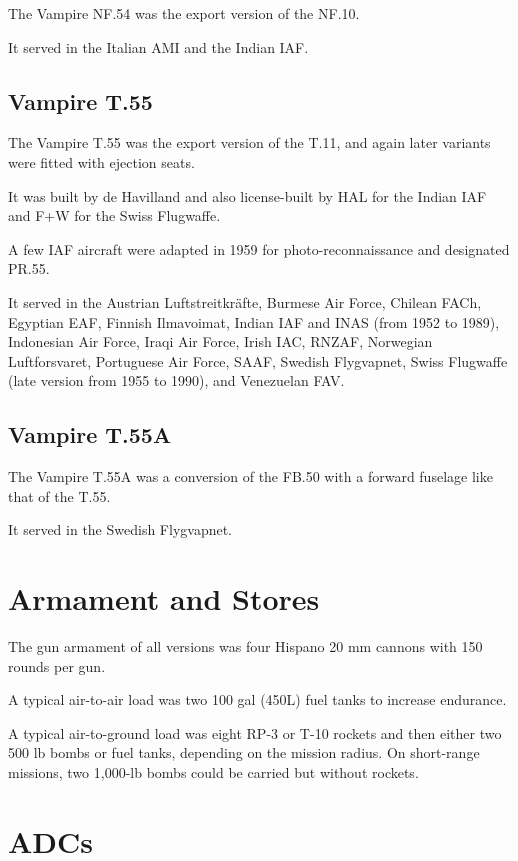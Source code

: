 The Vampire NF.54 was the export version of the NF.10.

It served in the Italian AMI and the Indian IAF.

\subsection{Vampire T.55}

The Vampire T.55 was the export version of the T.11, and again later variants were fitted with ejection seats.

It was built by de Havilland and also license-built by HAL for the Indian IAF and F+W for the Swiss Flugwaffe.

A few IAF aircraft were adapted in 1959 for photo-reconnaissance and designated PR.55.

It served in the Austrian Luftstreitkräfte, Burmese Air Force, Chilean FACh, Egyptian EAF, Finnish Ilmavoimat, Indian IAF and INAS (from 1952 to 1989), Indonesian Air Force, Iraqi Air Force, Irish IAC, RNZAF, Norwegian Luftforsvaret, Portuguese Air Force, SAAF, Swedish Flygvapnet, Swiss Flugwaffe (late version from 1955 to 1990), and Venezuelan FAV.

\subsection{Vampire T.55A}

The Vampire T.55A was a conversion of the FB.50 with a forward fuselage like that of the T.55.

It served in the Swedish Flygvapnet.

\section{Armament and Stores}

The gun armament of all versions was four Hispano 20 mm cannons with 150 rounds per gun.

A typical air-to-air load was two 100 gal (450L) fuel tanks to increase endurance.

A typical air-to-ground load was eight RP-3 or T-10 rockets and then either two 500 lb bombs or fuel tanks, depending on the mission radius. On short-range missions, two 1,000-lb bombs could be carried but without rockets.

\section{ADCs}

